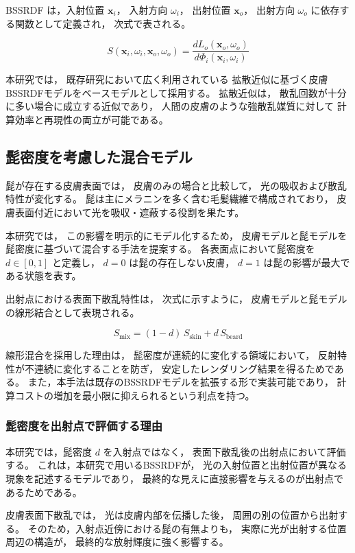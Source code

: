 BSSRDF は，入射位置 $\mathbf{x}_i$，
入射方向 $\omega_i$，
出射位置 $\mathbf{x}_o$，
出射方向 $\omega_o$ に依存する関数として定義され，
次式で表される。

\begin{equation}
S(\mathbf{x}_i, \omega_i, \mathbf{x}_o, \omega_o)
=
\frac{dL_o(\mathbf{x}_o, \omega_o)}
     {d\Phi_i(\mathbf{x}_i, \omega_i)}
\end{equation}


本研究では，
既存研究において広く利用されている
拡散近似に基づく皮膚BSSRDFモデルをベースモデルとして採用する。
拡散近似は，
散乱回数が十分に多い場合に成立する近似であり，
人間の皮膚のような強散乱媒質に対して
計算効率と再現性の両立が可能である。


\subsection{髭密度を考慮した混合モデル}
髭が存在する皮膚表面では，
皮膚のみの場合と比較して，
光の吸収および散乱特性が変化する。
髭は主にメラニンを多く含む毛髪繊維で構成されており，
皮膚表面付近において光を吸収・遮蔽する役割を果たす。

本研究では，
この影響を明示的にモデル化するため，
皮膚モデルと髭モデルを
髭密度に基づいて混合する手法を提案する。
各表面点において髭密度を
$d \in [0,1]$ と定義し，
$d=0$ は髭の存在しない皮膚，
$d=1$ は髭の影響が最大である状態を表す。

出射点における表面下散乱特性は，
次式に示すように，
皮膚モデルと髭モデルの線形結合として表現される。

\begin{equation}
S_{\mathrm{mix}}
=
(1 - d)\, S_{\mathrm{skin}} + d\, S_{\mathrm{beard}}
\end{equation}

線形混合を採用した理由は，
髭密度が連続的に変化する領域において，
反射特性が不連続に変化することを防ぎ，
安定したレンダリング結果を得るためである。
また，本手法は既存のBSSRDFモデルを拡張する形で実装可能であり，
計算コストの増加を最小限に抑えられるという利点を持つ。
\subsubsection{髭密度を出射点で評価する理由}
本研究では，髭密度 $d$ を入射点ではなく，
表面下散乱後の出射点において評価する。
これは，本研究で用いるBSSRDFが，
光の入射位置と出射位置が異なる現象を記述するモデルであり，
最終的な見えに直接影響を与えるのが出射点であるためである。

皮膚表面下散乱では，
光は皮膚内部を伝播した後，
周囲の別の位置から出射する。
そのため，入射点近傍における髭の有無よりも，
実際に光が出射する位置周辺の構造が，
最終的な放射輝度に強く影響する。

